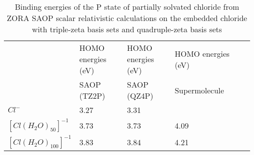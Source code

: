 \documentclass[a4paper,11pt]{report}
\begin{document}
\begin{table}[H]\small
\begin{center}
\caption{Binding energies of the P state of partially solvated chloride from ZORA SAOP scalar relativistic calculations on the embedded chloride with triple-zeta basis sets and quadruple-zeta basis sets} \label{tab:1}
\begin{tabular}{|l|l|l|l|l|l|}
\hline
&HOMO energies (eV)&HOMO energies (eV)&HOMO energies (eV)\\
&\hspace*{0.5cm}SAOP (TZ2P)&\hspace*{0.5cm}SAOP (QZ4P)&\hspace*{0.5cm}Supermolecule\\ 
\hline
$Cl^{-}$&\hspace*{1.0cm}3.27&\hspace*{1.0cm}3.31&\\
\hline
$[Cl(H_{2}O)_{50}]^{-1}$&\hspace*{1.0cm}3.73&\hspace*{1.0cm}3.73&\hspace*{1.0cm}4.09\\
\hline
$[Cl(H_{2}O)_{100}]^{-1}$&\hspace*{1.0cm}3.83&\hspace*{1.0cm}3.84&\hspace*{1.0cm}4.21\\
\hline
\end{tabular}
\label{table1}
\end{center}
\end{table}
\end{document}
